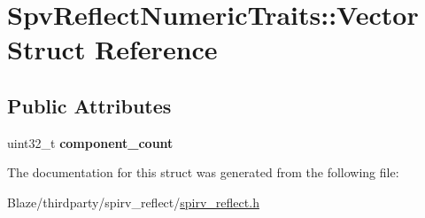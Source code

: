 \hypertarget{structSpvReflectNumericTraits_1_1Vector}{}\section{Spv\+Reflect\+Numeric\+Traits\+:\+:Vector Struct Reference}
\label{structSpvReflectNumericTraits_1_1Vector}
\subsection*{Public Attributes}
\begin{DoxyCompactItemize}
\item 
\mbox{\label{structSpvReflectNumericTraits_1_1Vector_a416b4b122e07a41d4f92b70b7b86d48c}} 
uint32\+\_\+t {\bfseries component\+\_\+count}
\end{DoxyCompactItemize}


The documentation for this struct was generated from the following file\+:\begin{DoxyCompactItemize}
\item 
Blaze/thirdparty/spirv\+\_\+reflect/\hyperlink{spirv__reflect_8h}{spirv\+\_\+reflect.\+h}\end{DoxyCompactItemize}
